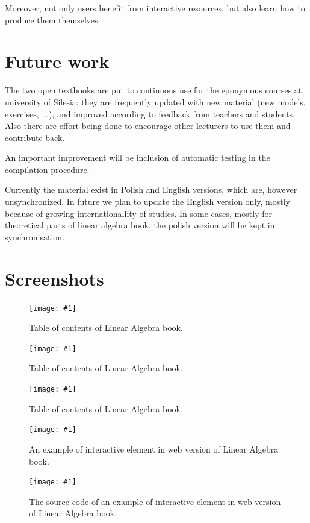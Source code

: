 \documentclass{deliverablereport}
\newcommand{\screenshot}[2]{
\begin{figure}[ht]
  \texttt{[image: \#1]}
  \caption{#2}
  \label{#1}
\end{figure}}
\newcommand{\screenshotsmall}[2]{
\begin{figure}[ht]
  \texttt{[image: \#1]}
  \caption{#2}
  \label{#1}
\end{figure}}
\begin{document}
Moreover, not only users benefit from interactive resources, but also
learn how to produce them themselves.

\section{Future work}


The two open textbooks are put to continuous use for the eponymous
courses at university of Silesia; they are frequently updated with new
material (new models, exercises, ...), and improved according to
feedback from teachers and students. Also there are effort being done
to encourage other lecturers to use them and contribute back.

An important improvement will be inclusion of automatic testing in
the compilation procedure.

Currently the material exist in Polish and English versions, which
are, however unsynchronized. In future we plan to update the English
version only, mostly because of growing internationallity of
studies. In some cases, mostly for theoretical parts of linear algebra
book, the polish version will be kept in synchronisation.



\clearpage
\appendix
\section{Screenshots}\label{screenshots}

\screenshot{toc1.png}{Table of contents of Linear Algebra book.}
\screenshot{toc2.png}{Table of contents of Linear Algebra book.}
\screenshot{toc3.png}{Table of contents of Linear Algebra book.}

\screenshot{la_book_ex.png}{An example of interactive element in web
  version of Linear Algebra book.}  \screenshotsmall{rst.png}{The
  source code of an example of interactive element in web version of
  Linear Algebra book.}
\end{document}
